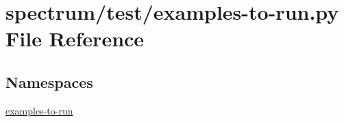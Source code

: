\hypertarget{spectrum_2test_2examples-to-run_8py}{}\section{spectrum/test/examples-\/to-\/run.py File Reference}
\label{spectrum_2test_2examples-to-run_8py}
\subsection*{Namespaces}
\begin{DoxyCompactItemize}
\item 
 \hyperlink{namespaceexamples-to-run}{examples-\/to-\/run}
\end{DoxyCompactItemize}
